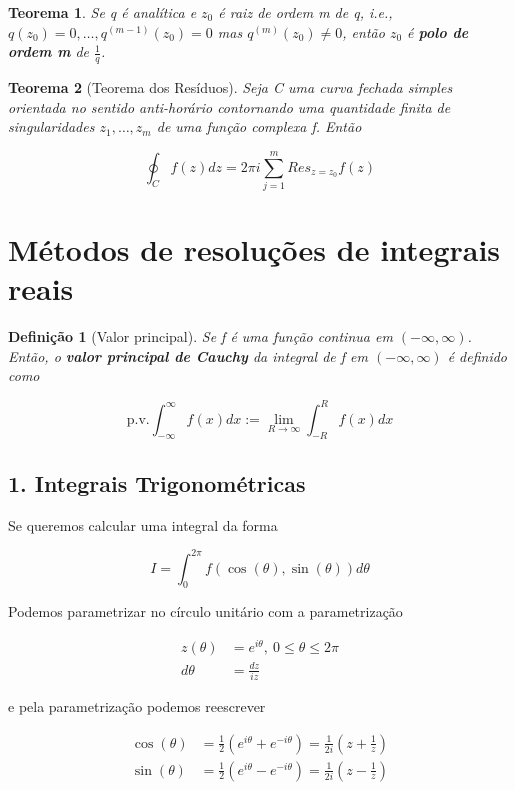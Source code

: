 \documentclass{article}
\newtheorem{theorem}{Teorema}
\newtheorem{definition}{Definição}
\begin{document}
\begin{theorem}
Se q é analítica e $z_0$ é raiz de ordem m de q, i.e., $q(z_0) = 0, \ldots, q^{(m - 1)}(z_0) = 0$ mas $q^{(m)}(z_0) \neq 0$, então $z_0$ é \textbf{polo de ordem m} de $\frac{1}{q}$.
\end{theorem}

\begin{theorem}[Teorema dos Resíduos]
Seja C uma curva fechada simples orientada no sentido anti-horário contornando uma quantidade finita de singularidades $z_1, \ldots, z_m$ de uma função complexa f. Então

$$\oint_C f(z) d z = 2 \pi i \sum_{j = 1}^m Res_{z = z_0} f(z)$$
\end{theorem}

\section*{Métodos de resoluções de integrais reais}
\label{s10}
\begin{definition}[Valor principal]
Se f é uma função continua em $(- \infty, \infty)$. Então, o \textbf{valor principal de Cauchy} da integral de f em $(- \infty, \infty)$ é definido como

$$\mathrm{p.v.} \int_{-\infty}^\infty f(x) d x := \lim_{R \to \infty} \int_{-R}^R f(x) d x$$
\end{definition}

\subsection*{1. Integrais Trigonométricas}
Se queremos calcular uma integral da forma

$$I = \int_0^{2\pi} f(\cos(\theta), \sin(\theta)) d \theta $$

Podemos parametrizar no círculo unitário com a parametrização

\begin{align*}
    z(\theta) &= e^{i \theta},\ 0 \leq \theta \leq 2 \pi \\
    d \theta &= \frac{d z}{i z}
\end{align*}

e pela parametrização podemos reescrever 

\begin{align*}
    \cos(\theta) &= \frac{1}{2} (e^{i \theta} + e^{ - i \theta}) = \frac{1}{2 i} \left(z + \frac{1}{z} \right) \\
    \sin(\theta) &= \frac{1}{2} (e^{i \theta} - e^{ - i \theta}) = \frac{1}{2 i} \left(z - \frac{1}{z} \right)
\end{align*}
\end{document}
